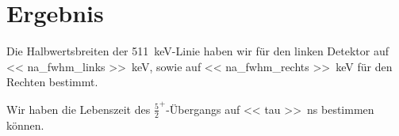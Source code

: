
\chapter{Ergebnis}

Die Halbwertsbreiten der \SI{511}{\kilo\electronvolt}-Linie haben wir für den
linken Detektor auf \SI{<< na_fwhm_links >>}{\kilo\electronvolt}, sowie auf
\SI{<< na_fwhm_rechts >>}{\kilo\electronvolt} für den Rechten bestimmt.

Wir haben die Lebenszeit des $\frac 52^+$-Übergangs auf \SI{<< tau
>>}{\nano\second} bestimmen können.

\IfFileExists{\bibliographyfile}{
    \printbibliography
}{}



